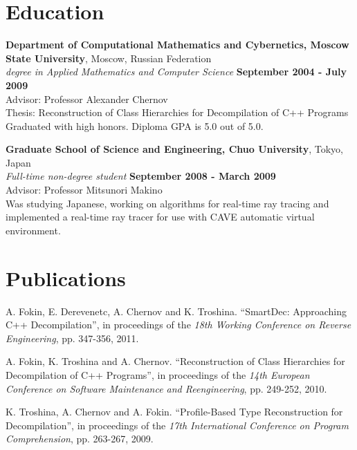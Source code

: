 \documentclass[margin,line]{CV}
\begin{document}
\begin{resume}
   
    \section{\mysidestyle Education}
    \textbf{Department of Computational Mathematics and Cybernetics, Moscow State University}, Moscow, Russian Federation\vspace{1mm}\\
    \textsl{ degree in Applied Mathematics and Computer Science} \hfill \textbf{September 2004 - July 2009}\vspace{1mm}\\
    Advisor: Professor Alexander Chernov \\
    Thesis: Reconstruction of Class Hierarchies for Decompilation of C++ Programs \\
    Graduated with high honors. Diploma GPA is 5.0 out of 5.0.

    \textbf{Graduate School of Science and Engineering, Chuo University}, Tokyo, Japan\vspace{1mm}\\
    \textsl{Full-time non-degree student} \hfill \textbf{September 2008 - March 2009}\vspace{1mm}\\
    Advisor: Professor Mitsunori Makino \\
    Was studying Japanese, working on algorithms for real-time ray tracing and implemented a real-time ray tracer for use with CAVE automatic virtual environment.

    
    \section{\mysidestyle Publications}
    A. Fokin, E. Derevenetc, A. Chernov and K. Troshina. ``SmartDec: Approaching C++ Decompilation'',
    in proceedings of the \textsl{18th Working Conference on Reverse Engineering}, pp. 347-356, 2011.

    A. Fokin, K. Troshina and A. Chernov. ``Reconstruction of Class Hierarchies for Decompilation of C++ Programs'',
    in proceedings of the \textsl{14th European Conference on Software Maintenance and Reengineering}, pp. 249-252, 2010.

    K. Troshina, A. Chernov and A. Fokin. ``Profile-Based Type Reconstruction for Decompilation'',
    in proceedings of the \textsl{17th International Conference on Program Comprehension}, pp. 263-267, 2009.



\end{resume}
\end{document}
